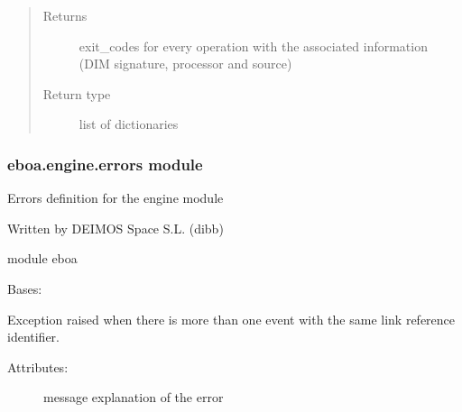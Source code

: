 \begin{fulllineitems}
\begin{fulllineitems}
\begin{quote}
\begin{description}
\item[{Returns}] \leavevmode
exit\_codes for every operation with the associated information (DIM signature, processor and source)

\item[{Return type}] \leavevmode
list of dictionaries

\end{description}\end{quote}

\end{fulllineitems}


\end{fulllineitems}



\subsubsection{eboa.engine.errors module}
\label{\detokenize{eboa.engine:module-eboa.engine.errors}}\label{\detokenize{eboa.engine:eboa-engine-errors-module}}
Errors definition for the engine module

Written by DEIMOS Space S.L. (dibb)

module eboa

\begin{fulllineitems}
\label{\detokenize{eboa.engine:eboa.engine.errors.DuplicatedEventLinkRef}}
Bases: {\hyperref[\detokenize{eboa.engine:eboa.engine.errors.Error}]{}}

Exception raised when there is more than one event with the same link reference identifier.
\begin{description}
\item[{Attributes:}] \leavevmode
message \textendash{} explanation of the error

\end{description}

\end{fulllineitems}


